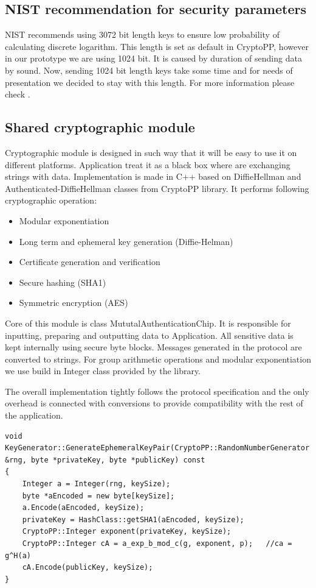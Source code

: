 \documentclass[11pt,titlepage]{article}
\theoremstyle{plain}
\begin{document}
\subsection{NIST recommendation for security parameters}

NIST recommends using 3072 bit length keys to ensure low probability of calculating discrete logarithm. This length is set as default in CryptoPP, however in our prototype we are using 1024 bit. It is caused by duration of sending data by sound. Now, sending 1024 bit length keys take some time and for needs of presentation we decided to stay with this length. For more information please check \cite{NIST}.

\subsection{Shared cryptographic module}
Cryptographic module is designed in such way that it will be easy to use it on different platforms. Application treat it as a black box where are exchanging strings with data. Implementation is made in C++ based on DiffieHellman and Authenticated-DiffieHellman classes from CryptoPP library. It performs following cryptographic operation:

\begin{itemize}
\item Modular exponentiation
\item Long term and ephemeral key generation (Diffie-Helman)
\item Certificate generation and verification
\item Secure hashing (SHA1)
\item Symmetric encryption (AES)
\end{itemize}

Core of this module is class MututalAuthenticationChip. It is responsible for inputting, preparing and outputting data to Application. All sensitive data is kept internally using secure byte blocks. Messages generated in the protocol are converted to strings.
For group arithmetic operations and modular exponentiation we use build in Integer class provided by the library. 

\vspace{5mm}

The overall implementation tightly follows the protocol specification and the only overhead is connected with conversions to provide compatibility with the rest of the application.
\begin{lstlisting}
void KeyGenerator::GenerateEphemeralKeyPair(CryptoPP::RandomNumberGenerator &rng, byte *privateKey, byte *publicKey) const
{
    Integer a = Integer(rng, keySize);
    byte *aEncoded = new byte[keySize];
    a.Encode(aEncoded, keySize);
    privateKey = HashClass::getSHA1(aEncoded, keySize);
    CryptoPP::Integer exponent(privateKey, keySize);
    CryptoPP::Integer cA = a_exp_b_mod_c(g, exponent, p);   //ca = g^H(a)
    cA.Encode(publicKey, keySize);
}
\end{lstlisting}
\end{document}
